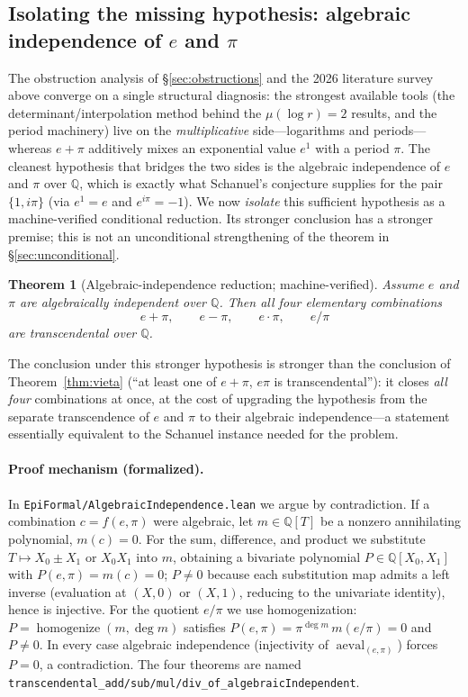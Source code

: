 \documentclass[11pt]{amsart}
\newtheorem{theorem}{Theorem}[section]
\theoremstyle{definition}
\theoremstyle{remark}
\numberwithin{equation}{section}
\newcommand{\Q}{\mathbb{Q}}
\newcommand{\irr}{\mu}
\begin{document}
\subsection{Isolating the missing hypothesis: algebraic independence of \texorpdfstring{$e$}{e} and \texorpdfstring{$\pi$}{pi}}\label{sec:lean-ai}

The obstruction analysis of \S\ref{sec:obstructions} and the 2026 literature survey above converge on a single structural diagnosis: the strongest available tools (the determinant/interpolation method behind the $\irr(\log r)=2$ results, and the period machinery) live on the \emph{multiplicative} side---logarithms and periods---whereas $e+\pi$ additively mixes an exponential value $e^1$ with a period $\pi$. The cleanest hypothesis that bridges the two sides is the algebraic independence of $e$ and $\pi$ over $\Q$, which is exactly what Schanuel's conjecture supplies for the pair $\{1,i\pi\}$ (via $e^1=e$ and $e^{i\pi}=-1$). We now \emph{isolate} this sufficient hypothesis as a machine-verified conditional reduction. Its stronger conclusion has a stronger premise; this is not an unconditional strengthening of the theorem in \S\ref{sec:unconditional}.

\begin{theorem}[Algebraic-independence reduction; machine-verified]\label{thm:ai-reduction}
Assume $e$ and $\pi$ are algebraically independent over $\Q$. Then all four elementary combinations
\[
e+\pi,\qquad e-\pi,\qquad e\cdot\pi,\qquad e/\pi
\]
are transcendental over $\Q$.
\end{theorem}

The conclusion under this stronger hypothesis is stronger than the conclusion of Theorem~\ref{thm:vieta} (``at least one of $e+\pi$, $e\pi$ is transcendental''): it closes \emph{all four} combinations at once, at the cost of upgrading the hypothesis from the separate transcendence of $e$ and $\pi$ to their algebraic independence---a statement essentially equivalent to the Schanuel instance needed for the problem.

\paragraph{Proof mechanism (formalized).} In \texttt{EpiFormal/\allowbreak{}AlgebraicIndependence.lean} we argue by contradiction. If a combination $c=f(e,\pi)$ were algebraic, let $m\in\Q[T]$ be a nonzero annihilating polynomial, $m(c)=0$. For the sum, difference, and product we substitute $T\mapsto X_0\pm X_1$ or $X_0X_1$ into $m$, obtaining a bivariate polynomial $P\in\Q[X_0,X_1]$ with $P(e,\pi)=m(c)=0$; $P\neq0$ because each substitution map admits a left inverse (evaluation at $(X,0)$ or $(X,1)$, reducing to the univariate identity), hence is injective. For the quotient $e/\pi$ we use homogenization: $P=\operatorname{homogenize}(m,\deg m)$ satisfies $P(e,\pi)=\pi^{\deg m}\,m(e/\pi)=0$ and $P\neq0$. In every case algebraic independence (injectivity of $\operatorname{aeval}_{(e,\pi)}$) forces $P=0$, a contradiction. The four theorems are named \texttt{transcendental\_\allowbreak{}add/\allowbreak{}sub/\allowbreak{}mul/\allowbreak{}div\_\allowbreak{}of\_\allowbreak{}algebraicIndependent}.
\end{document}
